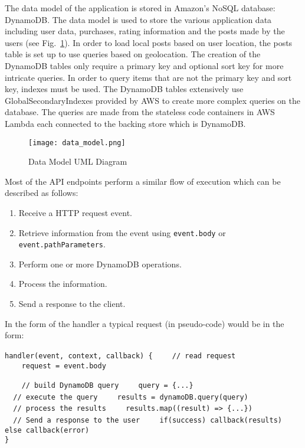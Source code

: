 \documentclass[conference]{IEEEtran}
\begin{document}
The data model of the application is stored in Amazon's NoSQL database: DynamoDB. The data model is used to store the various application data including user data, purchases, rating information and the posts made by the users (see Fig.~\ref{fig:data_model}). In order to load local posts based on user location, the posts table is set up to use queries based on geolocation. The creation of the DynamoDB tables only require a primary key and optional sort key for more intricate queries. In order to query items that are not the primary key and sort key, indexes must be used. The DynamoDB tables extensively use GlobalSecondaryIndexes provided by AWS to create more complex queries on the database. The queries are made from the stateless code containers in AWS Lambda each connected to the backing store which is DynamoDB.

\begin{figure}[htbp]
\centerline{\texttt{[image: data\_model.png]}}
\caption{Data Model UML Diagram}
\label{fig:data_model}
\end{figure}

Most of the API endpoints perform a similar flow of execution which can be described as follows:
\begin{enumerate}
\item Receive a HTTP request event.
\item Retrieve information from the event using \verb|event.body| or \verb|event.pathParameters|.
\item Perform one or more DynamoDB operations.
\item Process the information.
\item Send a response to the client.
\end{enumerate}
In the form of the handler a typical request (in pseudo-code) would be in the form:

\verb|handler(event, context, callback) {|
\verb|    // read request|\\
\verb|    request = event.body|

\verb|    // build DynamoDB query|
\verb|    query = {...}|\\

\verb|  // execute the query|
\verb|    results = dynamoDB.query(query)|\\

\verb|  // process the results|
\verb|    results.map((result) => {...})|\\

\verb|  // Send a response to the user|
\verb|    if(success) callback(results)|
\verb|    else callback(error)|\\
\verb|}|
\end{document}
